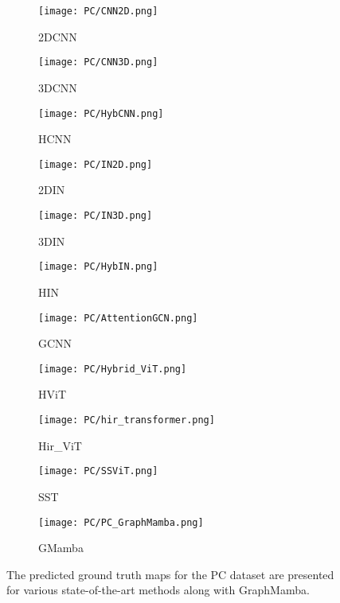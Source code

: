 \documentclass[journal]{IEEEtran}
\begin{document}
\begin{figure*}[!htb]
    \centering
        \begin{subfigure}{0.085\textwidth}
            \texttt{[image: PC/CNN2D.png]}
            \caption{2DCNN}
        \end{subfigure}
        \begin{subfigure}{0.085\textwidth}
            \centering
            \texttt{[image: PC/CNN3D.png]}
            \caption{3DCNN}
        \end{subfigure}
        \begin{subfigure}{0.085\textwidth}
            \centering
            \texttt{[image: PC/HybCNN.png]}
            \caption{HCNN}
        \end{subfigure}
        \begin{subfigure}{0.085\textwidth}
            \centering
            \texttt{[image: PC/IN2D.png]}
            \caption{2DIN}
        \end{subfigure}
        \begin{subfigure}{0.085\textwidth}
            \centering
            \texttt{[image: PC/IN3D.png]}
            \caption{3DIN}
        \end{subfigure}
        \begin{subfigure}{0.085\textwidth}
            \centering
            \texttt{[image: PC/HybIN.png]}
            \caption{HIN}
        \end{subfigure}
        \begin{subfigure}{0.085\textwidth}
            \centering
            \texttt{[image: PC/AttentionGCN.png]}
            \caption{GCNN}
        \end{subfigure}
        \begin{subfigure}{0.085\textwidth}
            \centering
            \texttt{[image: PC/Hybrid\_ViT.png]}
            \caption{HViT}
        \end{subfigure}
        \begin{subfigure}{0.085\textwidth}
            \centering
            \texttt{[image: PC/hir\_transformer.png]}
            \caption{Hir\_ViT}
        \end{subfigure}
        \begin{subfigure}{0.085\textwidth}
            \centering
            \texttt{[image: PC/SSViT.png]}
            \caption{SST}
        \end{subfigure}
        \begin{subfigure}{0.085\textwidth}
            \centering
            \texttt{[image: PC/PC\_GraphMamba.png]}
            \caption{GMamba}
        \end{subfigure}
    \caption{The predicted ground truth maps for the PC dataset are presented for various state-of-the-art methods along with GraphMamba.}
    \label{fig:PC_results}
\end{figure*}
\end{document}
